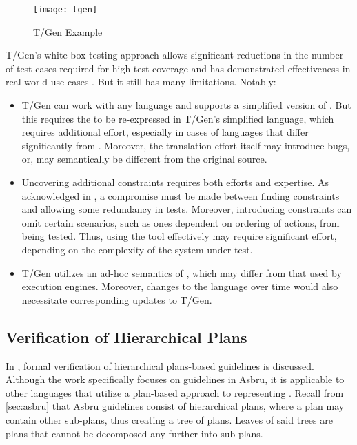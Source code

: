\begin{figure}[th]
  \centering
  \texttt{[image: tgen]}
  \caption{T/Gen Example}\label{fig:tgen-example}
\end{figure}

T/Gen's white-box testing approach allows significant reductions in the
number of test cases required for high test-coverage and has demonstrated
effectiveness in real-world use cases \cite{MillerJAMIA01}. But it still has
many limitations. Notably:
\begin{itemize}
  \item T/Gen can work with any \CIG{} language and supports
  a simplified version of \GLIF{}. But this requires the \CIG{} to
  be re-expressed in T/Gen's simplified language,
  which requires additional effort, especially in cases of languages that differ
    significantly from \GLIF{}. Moreover, the translation effort itself may
    introduce bugs, or, may semantically be different from the original source.
  \item Uncovering additional constraints requires both efforts and expertise.
    As acknowledged in \cite{MillerJAMIA01}, a compromise must be made between
    finding constraints and allowing some redundancy in tests. Moreover,
    introducing constraints can omit certain scenarios, such
    as ones dependent on ordering of actions, from being tested.
    Thus, using the tool effectively may require significant effort, depending
    on the complexity of the system under test.
  \item T/Gen utilizes an ad-hoc semantics of \GLIF{}, which may differ from
    that used by \GLIF{} execution engines. Moreover, changes to the \GLIF{} language
    over time would also necessitate corresponding updates to T/Gen.
\end{itemize}

\subsection{Verification of Hierarchical Plans}\label{sec:asbru-verification}

In \cite{DuftschmidAIM01}, formal verification of hierarchical plans-based
guidelines is discussed. Although the work specifically focuses on guidelines in
Asbru, it is applicable to other languages that utilize a plan-based approach
to representing \BPGs{}. Recall from \autoref{sec:asbru} that Asbru guidelines
consist of hierarchical plans, where a plan may contain other sub-plans,
thus creating a tree of plans. Leaves of said trees are plans that cannot
be decomposed any further into sub-plans.

